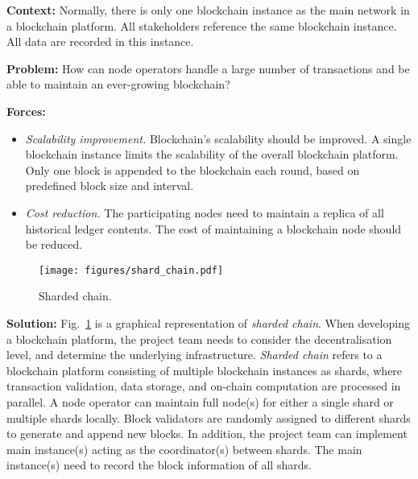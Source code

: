 \documentclass{article}
\begin{document}
\vspace{0.5em}\noindent \textbf{Context:} Normally, there is only one blockchain instance as the main network in a blockchain platform. All stakeholders reference the same blockchain instance. All data are recorded in this instance.

\vspace{0.5em}\noindent \textbf{Problem:} How can node operators handle a large number of transactions and be able to maintain an ever-growing blockchain?

\vspace{0.5em}\noindent \textbf{Forces:} 

\begin{itemize}
  \item \textit{Scalability improvement.} Blockchain's scalability should be improved. A single blockchain instance limits the scalability of the overall blockchain platform. Only one block is appended to the blockchain each round, based on predefined block size and interval.

  
  \item \textit{Cost reduction.} The participating nodes need to maintain a replica of all historical ledger contents. The cost of maintaining a blockchain node should be reduced.

\end{itemize}

\begin{figure}[!ht]
	\centering
	\texttt{[image: figures/shard\_chain.pdf]}
	\caption{Sharded chain.}
	\label{pic:shard_chain}
\end{figure}

\vspace{0.5em}\noindent \textbf{Solution:} Fig.~\ref{pic:shard_chain} is a graphical representation of \textit{sharded chain}. When developing a blockchain platform, the project team needs to consider the decentralisation level, and determine the underlying infrastructure. \textit{Sharded chain} refers to a blockchain platform consisting of multiple blockchain instances as shards, where transaction validation, data storage, and on-chain computation are processed in parallel. A node operator can maintain full node(s) for either a single shard or multiple shards locally. Block validators are randomly assigned to different shards to generate and append new blocks. In addition, the project team can implement main instance(s) acting as the coordinator(s) between shards. The main instance(s) need to record the block information of all shards.
\end{document}
